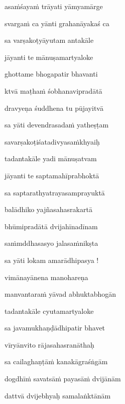 \nemslokad 
asa\.mśaya\.m trāyati yāmyamārge \veg\dontdisplaylinenum

\ujvers\nemsloka 
svarga\.m ca yānti grahanāyakaś ca
\dontdisplaylinenum

\nemslokab 
sa varṣakoṭyāyutam antakāle \danda\dontdisplaylinenum

\nemslokac 
jāyanti te mānuṣamartyaloke
\dontdisplaylinenum

\nemslokad 
ghottame bhogapatir bhavanti \veg\dontdisplaylinenum

\ujvers\nemsloka 
ktvā maṭha\.m śobhanavipradātā
\dontdisplaylinenum

\nemslokab 
dravyeṇa śuddhena tu pūjayitvā \danda\dontdisplaylinenum

\nemslokac 
sa yāti devendrasada\.m yatheṣṭam
\dontdisplaylinenum

\nemslokad 
savarṣakoṭiśatadivyasa\.mkhyaiḥ \veg\dontdisplaylinenum

\ujvers\nemsloka 
tadantakāle yadi mānuṣatvam
\dontdisplaylinenum

\nemslokab 
jāyanti te saptamahīprabhoktā \danda\dontdisplaylinenum

\nemslokac 
sa saptarathyatrayasamprayuktā
\dontdisplaylinenum

\nemslokad 
balādhiko yajñasahasrakartā \veg\dontdisplaylinenum

\ujvers\nemsloka 
bhūmipradātā dvijahīnadīnam
\dontdisplaylinenum

\nemslokab 
sa\.mmddhasasyo jalasa\.mnikṣta \danda\dontdisplaylinenum

\nemslokac 
sa yāti lokam amarādhipasya !
\dontdisplaylinenum

\nemslokad 
vimānayānena manohareṇa \veg\dontdisplaylinenum

\ujvers\nemsloka 
manvantara\.m yāvad abhuktabhogān
\dontdisplaylinenum

\nemslokab 
tadantakāle cyutamartyaloke \danda\dontdisplaylinenum

\nemslokac 
sa javamukhaṇḍādhipatir bhavet
\dontdisplaylinenum

\nemslokad 
vīryānvito rājasahasranāthaḥ \veg\dontdisplaylinenum

\ujvers\nemsloka 
sa cailaghaṇṭā\.m kanakāgraśṅgām
\dontdisplaylinenum

\nemslokab 
dogdhī\.m savatsā\.m payasā\.m dvijānām \danda\dontdisplaylinenum

\nemslokac 
dattvā dvijebhyaḥ samalaṅktānām
\dontdisplaylinenum

